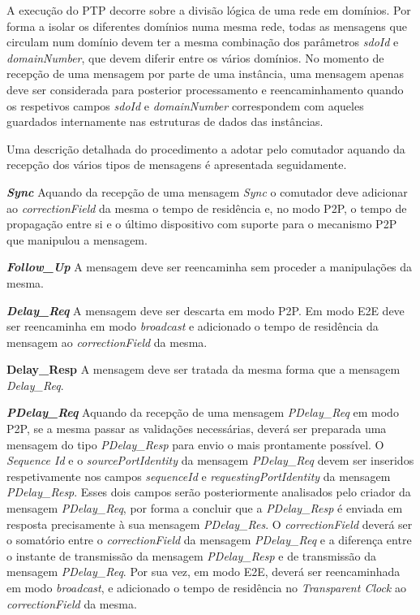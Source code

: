 A execução do PTP decorre sobre a divisão lógica de uma rede em domínios. Por forma a isolar os diferentes domínios numa mesma rede, todas as mensagens que circulam num domínio devem ter a mesma combinação dos parâmetros \textit{sdoId} e \textit{domainNumber}, que devem diferir entre os vários domínios. No momento de recepção de uma mensagem por parte de uma instância, uma mensagem apenas deve ser considerada para posterior processamento e reencaminhamento quando os respetivos campos \textit{sdoId} e \textit{domainNumber} correspondem com aqueles guardados internamente nas estruturas de dados das instâncias. \par
Uma descrição detalhada do procedimento a adotar pelo comutador aquando da recepção dos vários tipos de mensagens é apresentada seguidamente.

\textbf{\textit{Sync}} Aquando da recepção de uma mensagem \textit{Sync} o comutador deve adicionar ao \textit{correctionField} da mesma o tempo de residência e, no modo P2P, o tempo de propagação entre si e o último dispositivo com suporte para o mecanismo P2P que manipulou a mensagem. \par

\textbf{\textit{Follow\_Up}} A mensagem deve ser reencaminha sem proceder a manipulações da mesma. \par

\textbf{\textit{Delay\_Req}} A mensagem deve ser descarta em modo P2P. Em modo E2E deve ser reencaminha em modo \textit{broadcast} e adicionado o tempo de residência da mensagem ao \textit{correctionField} da mesma. \par

\textbf{Delay\_Resp} A mensagem deve ser tratada da mesma forma que a mensagem \textit{Delay\_Req}. \par

\textbf{\textit{PDelay\_Req}} Aquando da recepção de uma mensagem \textit{PDelay\_Req} em modo P2P, se a mesma passar as validações necessárias, deverá ser preparada uma mensagem do tipo \textit{PDelay\_Resp} para envio o mais prontamente possível. O \textit{Sequence Id} e o \textit{sourcePortIdentity} da mensagem \textit{PDelay\_Req} devem ser inseridos respetivamente nos campos \textit{sequenceId} e \textit{requestingPortIdentity} da mensagem \textit{PDelay\_Resp}. Esses dois campos serão posteriormente analisados pelo criador da mensagem \textit{PDelay\_Req}, por forma a concluir que a \textit{PDelay\_Resp} é enviada em resposta precisamente à sua mensagem \textit{PDelay\_Res}. O \textit{correctionField} deverá ser o somatório entre o \textit{correctionField} da mensagem \textit{PDelay\_Req} e a diferença entre o instante de transmissão da mensagem \textit{PDelay\_Resp} e de transmissão da mensagem \textit{PDelay\_Req}. Por sua vez, em modo E2E, deverá ser reencaminhada em modo \textit{broadcast}, e adicionado o tempo de residência no \textit{Transparent Clock} ao \textit{correctionField} da mesma.

